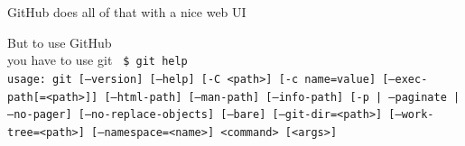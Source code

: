 \documentclass[xcolor=svgnames,17pt]{beamer}
\begin{document}
\begin{frame}
\tableofcontents[currentsection]
\end{frame}

\begin{frame}{GitHub does all of that with a nice web UI}
\end{frame}

\begin{frame}[fragile]{But to use GitHub \\ you have to use git}
\texttt{
\$ git help \\
usage: git [--version] [--help] [-C <path>] [-c name=value]
           [--exec-path[=<path>]] [--html-path] [--man-path] [--info-path]
           [-p | --paginate | --no-pager] [--no-replace-objects] [--bare]
           [--git-dir=<path>] [--work-tree=<path>] [--namespace=<name>]
           <command> [<args>]
}
\end{frame}
\end{document}
